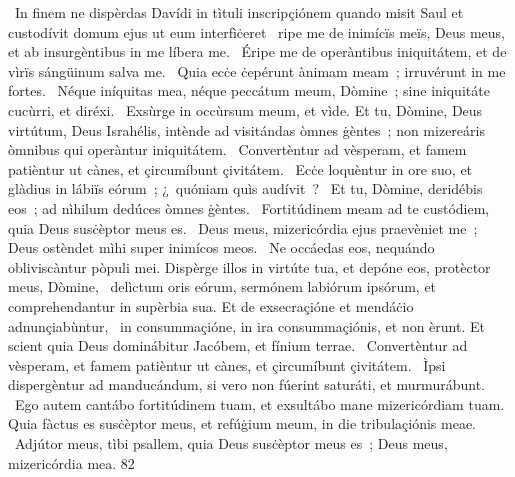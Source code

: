 {~In finem ne dispèrdas Davídi in tìtuli inscripçiónem quando misit Saul et custodívit domum ejus ut eum interfìċeret}
{%
~ripe me de inimícïs meïs, Deus meus, et ab insurgèntibus in me líbera me.
~Éripe me de operàntibus iniquitátem, et de vìrïs sángüinum salva me.
~Quia ecċe ċepérunt ànimam meam~; irruvérunt in me fortes.
~Néque iníquitas mea, néque peccátum meum, Dòmine~; sine iniquitáte cucùrri, et diréxi.
~Exsùrge in occùrsum meum, et vìde. Et tu, Dòmine, Deus virtútum, Deus Israhélis, intènde ad visitándas òmnes ġèntes~; non mizereáris òmnibus qui operàntur iniquitátem.
~Convertèntur ad vèsperam, et famem patièntur ut cànes, et çircumíbunt çivitátem.
~Ecċe loquèntur in ore suo, et glàdius in lábiïs eórum~; ¿~quóniam quìs audívit~?
~Et tu, Dòmine, deridébis eos~; ad nìhilum dedúces òmnes ġèntes.
~Fortitúdinem meam ad te custódiem, quia Deus susċèptor meus es.
~Deus meus, mizericórdia ejus praevèniet me~; Deus ostèndet mìhi super inimícos meos.
~Ne occáedas eos, nequándo obliviscàntur pòpuli mei. Dispèrge illos in virtúte tua, et depóne eos, protèctor meus, Dòmine,
~delìctum oris eórum, sermónem labiórum ipsórum, et comprehendantur in supèrbia sua. Et de exsecraçióne et mendáċio adnunçiabùntur,
~in consummaçióne, in ira consummaçiónis, et non èrunt. Et scient quia Deus dominábitur Jacóbem, et fínium terrae.
~Convertèntur ad vèsperam, et famem patièntur ut cànes, et çircumíbunt çivitátem.
~Ìpsi dispergèntur ad manducándum, si vero non fúerint saturáti, et murmurábunt.
~Ego autem cantábo fortitúdinem tuam, et exsultábo mane mizericórdiam tuam. Quia fàctus es susċèptor meus, et refúġium meum, in die tribulaçiónis meae.
~Adjútor meus, tìbi psallem, quia Deus susċèptor meus es~; Deus meus, mizericórdia mea.
}
{8}{2}
